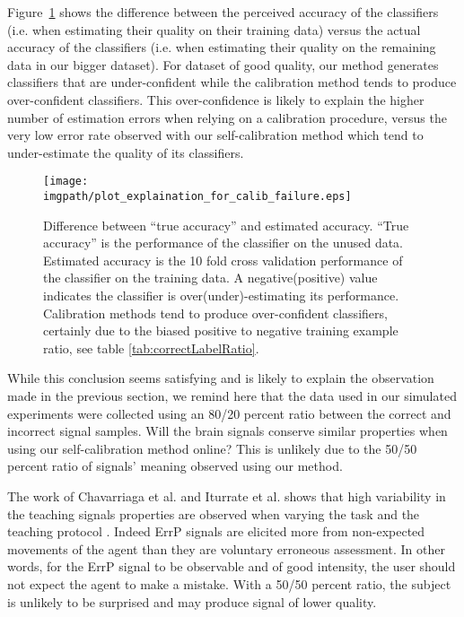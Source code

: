 
Figure~\ref{fig:calibFail} shows the difference between the perceived accuracy of the classifiers (i.e. when estimating their quality on their training data) versus the actual accuracy of the classifiers (i.e. when estimating their quality on the remaining data in our bigger dataset). For dataset of good quality, our method generates classifiers that are under-confident while the calibration method tends to produce over-confident classifiers. This over-confidence is likely to explain the higher number of estimation errors when relying on a calibration procedure, versus the very low error rate observed with our self-calibration method which tend to under-estimate the quality of its classifiers.

\begin{figure}[!htbp]
\centering
\texttt{[image: \\imgpath/plot\_explaination\_for\_calib\_failure.eps]}
\caption{Difference between ``true accuracy'' and estimated accuracy. ``True accuracy'' is the performance of the classifier on the unused data. Estimated accuracy is the 10 fold cross validation performance of the classifier on the training data. A negative(positive) value indicates the classifier is over(under)-estimating its performance. Calibration methods tend to produce over-confident classifiers, certainly due to the biased positive to negative training example ratio, see table \ref{tab:correctLabelRatio}.}
\label{fig:calibFail}
\end{figure}

While this conclusion seems satisfying and is likely to explain the observation made in the previous section, we remind here that the data used in our simulated experiments were collected using an 80/20 percent ratio between the correct and incorrect signal samples. Will the brain signals conserve similar properties when using our self-calibration method online? This is unlikely due to the 50/50 percent ratio of signals' meaning observed using our method. 

The work of Chavarriaga et al. and Iturrate et al. shows that high variability in the teaching signals properties are observed when varying the task and the teaching protocol \cite{chavarriaga2010learning, iturrate2013task}. Indeed ErrP signals are elicited more from non-expected movements of the agent than they are voluntary erroneous assessment. In other words, for the ErrP signal to be observable and of good intensity, the user should not expect the agent to make a mistake. With a 50/50 percent ratio, the subject is unlikely to be surprised and may produce signal of lower quality.

